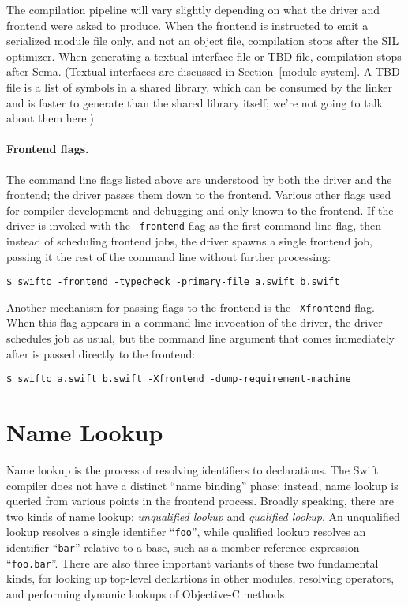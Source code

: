 \documentclass[../generics]{subfiles}
\begin{document}
The compilation pipeline will vary slightly depending on what the driver and frontend were asked to produce. When the frontend is instructed to emit a serialized module file only, and not an object file, compilation stops after the SIL optimizer. When generating a textual interface file or TBD file, compilation stops after Sema. (Textual interfaces are discussed in Section~\ref{module system}. A TBD file is a list of symbols in a shared library, which can be consumed by the linker and is faster to generate than the shared library itself; we're not going to talk about them here.)

\paragraph{Frontend flags.}
The command line flags listed above are understood by both the driver and the frontend; the driver passes them down to the frontend. Various other flags used for compiler development and debugging and only known to the frontend. If the driver is invoked with the \texttt{-frontend} flag as the first command line flag, then instead of scheduling frontend jobs, the driver spawns a single frontend job, passing it the rest of the command line without further processing:
\begin{Verbatim}
$ swiftc -frontend -typecheck -primary-file a.swift b.swift
\end{Verbatim}
Another mechanism for passing flags to the frontend is the \texttt{-Xfrontend} flag. When this flag appears in a command-line invocation of the driver, the driver schedules job as usual, but the command line argument that comes immediately after is passed directly to the frontend:
\begin{Verbatim}
$ swiftc a.swift b.swift -Xfrontend -dump-requirement-machine
\end{Verbatim}

\section{Name Lookup}\label{name lookup}

Name lookup is the process of resolving identifiers to declarations. The Swift compiler does not have a distinct ``name binding'' phase; instead, name lookup is queried from various points in the frontend process. Broadly speaking, there are two kinds of name lookup: \emph{unqualified lookup} and \emph{qualified lookup}. An unqualified lookup resolves a single identifier ``\texttt{foo}'', while qualified lookup resolves an identifier ``\texttt{bar}'' relative to a base, such as a member reference expression ``\texttt{foo.bar}''. There are also three important variants of these two fundamental kinds, for looking up top-level declartions in other modules, resolving operators, and performing dynamic lookups of Objective-C methods.
\end{document}
